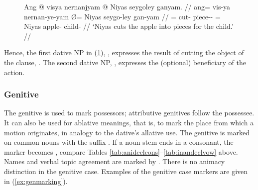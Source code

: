 \begin{figure}[h]
\ex\label{ex:resultdat}\begingl
	\gla Ang @ visya nernanjyam {} @ Niyas seygoley ganyam. //
	\glb ang= vis-ya nernan-ye-yam Ø= Niyas seygo-ley gan-yam //
	\glc \AgtT{}= cut-\TsgM{} piece-\Pl{}-\Dat{} \Top{}= Niyas apple-\PargI{}
		child-\Dat{} //
	\glft `Niyas cuts the apple into pieces for the child.' //
\endgl\xe
\end{figure}

Hence, the first dative NP in (\ref{ex:resultdat}),
, expresses the result of cutting
the object of the clause, . The second dative
NP, , expresses the (optional) beneficiary
of the action.


\subsubsection{Genitive}
\label{subsubsec:genitive}

The genitive is used to mark possessors; attributive genitives follow the
possessee. It can also be used for ablative meanings, that is, to mark the
place from which a motion originates, in analogy to the dative's allative use.
The genitive is marked on common nouns with the suffix . If a
noun stem ends in a consonant, the marker becomes , compare
Tables \ref{tab:anideclcons}--\ref{tab:inandeclvow} above. Names and verbal
topic agreement are marked by . There is no animacy distinction in
the genitive case. Examples of the genitive case markers are given in
(\ref{ex:genmarking}).

